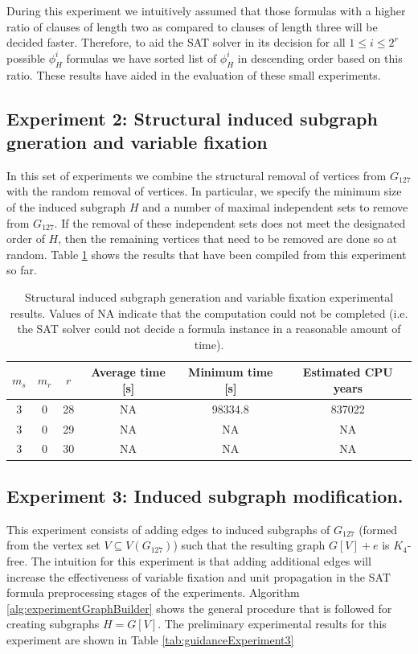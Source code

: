 \documentclass[paper=a4, fontsize=11pt]{scrartcl} %
\begin{document}
During this experiment we intuitively assumed that those formulas with a 
higher ratio of clauses of length two as compared to clauses of length 
three will be decided faster. Therefore, to aid the SAT solver in its
decision for all $1 \leq i \leq 2^{r}$ possible $\phi_H^i$ formulas
we have sorted list of $\phi_H^i$ in descending order based on this ratio. 
These results have aided in the evaluation of these small experiments. 


\subsection{Experiment 2: Structural induced subgraph gneration and variable fixation}
In this set of experiments we combine the structural removal of vertices from $G_{127}$
with the random removal of vertices. In particular, we specify the minimum size of 
the induced subgraph $H$ and a number of maximal independent sets to remove from $G_{127}$.
If the removal of these independent sets does not meet the designated order of $H$,
then the remaining vertices that need to be removed are done so at random. Table \ref{tab:guidanceExperiment2}
shows the results that have been compiled from this experiment so far.

\begin{table}
	\caption{Structural induced subgraph generation and variable fixation
	experimental results. Values of NA indicate that the computation
	could not be completed (i.e. the SAT solver could not decide a formula instance in a reasonable
	amount of time).}
	\begin{tabular}{c | c | c | c | c | c}
		\hline
		$m_s$ & $m_r$ & $r$ & Average time [s] & Minimum time [s] & Estimated CPU years \\ \hline
		3 & 0 & 28 & NA & 98334.8 & 837022 \\ \hline
		3 & 0 & 29 & NA & NA & NA \\ \hline
		3 & 0 & 30 & NA & NA & NA \\ 
		\hline
	\end{tabular}
	\label{tab:guidanceExperiment2}
\end{table}

\subsection{Experiment 3: Induced subgraph modification.}
This experiment consists of adding edges to induced subgraphs of $G_{127}$ (formed
from the vertex set $V \subseteq V(G_{127})$) such that the resulting graph 
$G[V] + e$ is $K_4$-free. The intuition for this experiment is that
adding additional edges will increase the effectiveness of variable fixation
and unit propagation in the SAT formula preprocessing stages of the experiments.
Algorithm \ref{alg:experimentGraphBuilder} shows the general procedure
that is followed for creating subgraphs $H = G[V]$. The preliminary experimental
results for this experiment are shown in Table \ref{tab:guidanceExperiment3}
\end{document}
